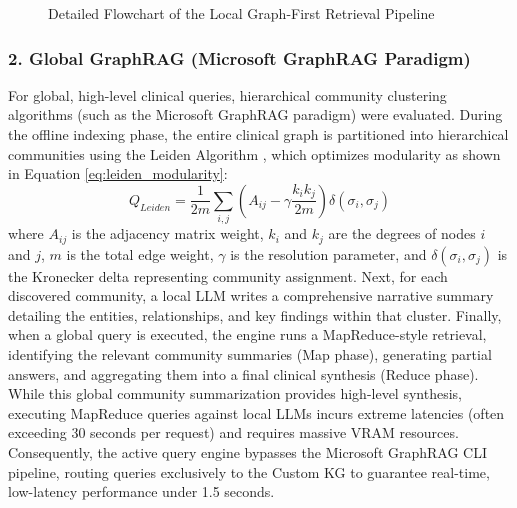 \documentclass[../main.tex]{subfiles}
\begin{document}
\begin{figure}[H]
{%
    }
    \caption{Detailed Flowchart of the Local Graph-First Retrieval Pipeline}
    \label{fig:graphrag_retrieval_flowchart}
\end{figure}

\subsubsection{2. Global GraphRAG (Microsoft GraphRAG Paradigm)}
For global, high-level clinical queries, hierarchical community clustering algorithms (such as the Microsoft GraphRAG paradigm) were evaluated. During the offline indexing phase, the entire clinical graph is partitioned into hierarchical communities using the Leiden Algorithm \cite{traag2019from}, which optimizes modularity as shown in Equation \eqref{eq:leiden_modularity}:
\begin{equation}\label{eq:leiden_modularity}
Q_{Leiden} = \frac{1}{2m} \sum_{i,j} \left( A_{ij} - \gamma \frac{k_i k_j}{2m} \right) \delta(\sigma_i, \sigma_j)
\end{equation}
where $A_{ij}$ is the adjacency matrix weight, $k_i$ and $k_j$ are the degrees of nodes $i$ and $j$, $m$ is the total edge weight, $\gamma$ is the resolution parameter, and $\delta(\sigma_i, \sigma_j)$ is the Kronecker delta representing community assignment. Next, for each discovered community, a local LLM writes a comprehensive narrative summary detailing the entities, relationships, and key findings within that cluster. Finally, when a global query is executed, the engine runs a MapReduce-style retrieval, identifying the relevant community summaries (Map phase), generating partial answers, and aggregating them into a final clinical synthesis (Reduce phase).
While this global community summarization provides high-level synthesis, executing MapReduce queries against local LLMs incurs extreme latencies (often exceeding 30 seconds per request) and requires massive VRAM resources. Consequently, the active query engine bypasses the Microsoft GraphRAG CLI pipeline, routing queries exclusively to the Custom KG to guarantee real-time, low-latency performance under 1.5 seconds.
\end{document}
